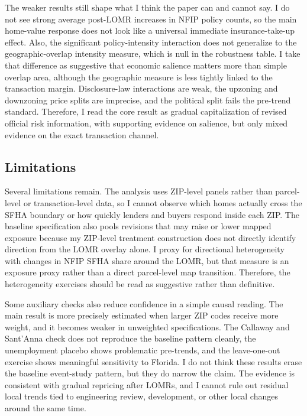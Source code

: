 \documentclass[12pt]{article}
\begin{document}
The weaker results still shape what I think the paper can and cannot say. I do not see strong average post-LOMR increases in NFIP policy counts, so the main home-value response does not look like a universal immediate insurance-take-up effect. Also, the significant policy-intensity interaction does not generalize to the geographic-overlap intensity measure, which is null in the robustness table. I take that difference as suggestive that economic salience matters more than simple overlap area, although the geographic measure is less tightly linked to the transaction margin. Disclosure-law interactions are weak, the upzoning and downzoning price splits are imprecise, and the political split fails the pre-trend standard. Therefore, I read the core result as gradual capitalization of revised official risk information, with supporting evidence on salience, but only mixed evidence on the exact transaction channel.

\subsection{Limitations}

Several limitations remain. The analysis uses ZIP-level panels rather than parcel-level or transaction-level data, so I cannot observe which homes actually cross the SFHA boundary or how quickly lenders and buyers respond inside each ZIP. The baseline specification also pools revisions that may raise or lower mapped exposure because my ZIP-level treatment construction does not directly identify direction from the LOMR overlay alone. I proxy for directional heterogeneity with changes in NFIP SFHA share around the LOMR, but that measure is an exposure proxy rather than a direct parcel-level map transition. Therefore, the heterogeneity exercises should be read as suggestive rather than definitive.

Some auxiliary checks also reduce confidence in a simple causal reading. The main result is more precisely estimated when larger ZIP codes receive more weight, and it becomes weaker in unweighted specifications. The Callaway and Sant'Anna check does not reproduce the baseline pattern cleanly, the unemployment placebo shows problematic pre-trends, and the leave-one-out exercise shows meaningful sensitivity to Florida. I do not think these results erase the baseline event-study pattern, but they do narrow the claim. The evidence is consistent with gradual repricing after LOMRs, and I cannot rule out residual local trends tied to engineering review, development, or other local changes around the same time.
\end{document}
